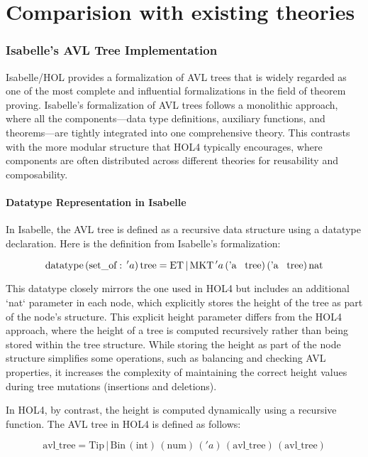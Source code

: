 \chapter{Comparision with existing theories}\label{chap:LaTeXAdvice}

\subsection{Isabelle’s AVL Tree Implementation}

Isabelle/HOL provides a formalization of AVL trees that is widely regarded as one of the most complete and influential formalizations in the field of theorem proving. Isabelle's formalization of AVL trees follows a monolithic approach, where all the components—data type definitions, auxiliary functions, and theorems—are tightly integrated into one comprehensive theory. This contrasts with the more modular structure that HOL4 typically encourages, where components are often distributed across different theories for reusability and composability.

\subsubsection{Datatype Representation in Isabelle}
In Isabelle, the AVL tree is defined as a recursive data structure using a datatype declaration. Here is the definition from Isabelle’s formalization:

\[
\text{datatype} \, (\text{set\_of}: \, 'a) \, \text{tree} = 
\text{ET} \, | \, \text{MKT} \, 'a \, (\text{'a \, tree}) \, (\text{'a \, tree}) \, \text{nat}
\]

This datatype closely mirrors the one used in HOL4 but includes an additional `nat` parameter in each node, which explicitly stores the height of the tree as part of the node’s structure. This explicit height parameter differs from the HOL4 approach, where the height of a tree is computed recursively rather than being stored within the tree structure. While storing the height as part of the node structure simplifies some operations, such as balancing and checking AVL properties, it increases the complexity of maintaining the correct height values during tree mutations (insertions and deletions).

In HOL4, by contrast, the height is computed dynamically using a recursive function. The AVL tree in HOL4 is defined as follows:

\[
\text{avl\_tree} = \text{Tip} \, | \, \text{Bin} \, (\text{int}) \, (\text{num}) \, ('a) \, (\text{avl\_tree}) \, (\text{avl\_tree})
\]


